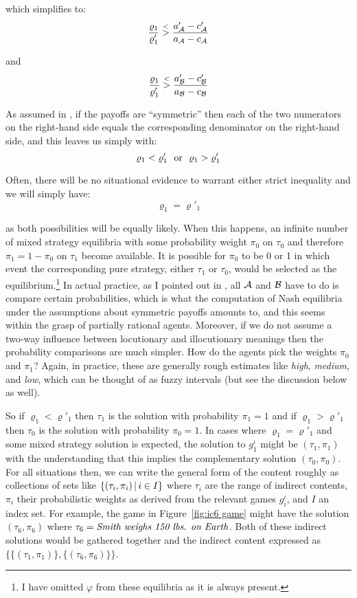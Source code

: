 \noindent which simplifies to: \[ \frac{\varrho_1}{\varrho'_1} \stackrel{<}{>} \frac{a'_{\cal A} - c'_{\cal A}}{a_{\cal A} - c_{\cal A}} \]

\noindent and \[ \frac{\varrho_1}{\varrho'_1} \stackrel{<}{>} \frac{a'_{\cal B} - c'_{\cal B}}{a_{\cal B} - c_{\cal B}} \]

\noindent As assumed in , if the payoffs are ``symmetric'' then each of the two numerators on the right-hand side equals the corresponding denominator on the right-hand side, and this leaves us simply with: \[ \varrho_1 < \varrho'_1\ \  \hbox{or}\ \ \varrho_1 > \varrho'_1 \]

\noindent Often, there will be no situational evidence to warrant either strict inequality and we will simply have: \[ \varrho_1 = \varrho'_1 \]

\noindent as both possibilities will be equally likely. When this happens, an infinite number of mixed strategy equilibria with some probability weight $\pi_0$ on $\tau_0$ and therefore $\pi_1 = 1 - \pi_0$ on $\tau_1$ become available. It is possible for $\pi_0$ to be 0 or 1 in which event the corresponding pure strategy, either $\tau_1$ or $\tau_0$, would be selected as the equilibrium.\footnote{I have omitted $\varphi$ from these equilibria as it is always present.} In actual practice, as I pointed out in , all $\cal A$ and $\cal B$ have to do is compare certain probabilities, which is what the computation of Nash equilibria under the assumptions about symmetric payoffs amounts to, and this seems within the grasp of partially rational agents. Moreover, if we do not assume a two-way influence between locutionary and illocutionary meanings then the probability comparisons are much simpler. How do the agents pick the weights $\pi_0$ and $\pi_1$? Again, in practice, these are generally rough estimates like \emph{high}, \emph{medium}, and \emph{low}, which can be thought of as fuzzy intervals (but see the discussion below as well). 


So if $\varrho_1 < \varrho'_1$ then $\tau_1$ is the solution with probability $\pi_1 = 1$ and if $\varrho_1 > \varrho'_1$ then $\tau_0$ is the solution with probability $\pi_0 = 1$. In cases where $\varrho_1 = \varrho'_1$ and some mixed strategy solution is expected, the solution to $g^\iota_1$ might be $(\tau_1, \pi_1)$ with the understanding that this implies the complementary solution $(\tau_0, \pi_0)$. For all situations then, we can write the general form of the content roughly as collections of sets like $\{(\tau_i, \pi_i) \,|\, i \in I\}$ where $\tau_i$ are the range of indirect contents, $\pi_i$ their probabilistic weights as derived from the relevant games $g^\iota_i$, and $I$ an index set. For example, the game in Figure~\ref{fig:ic6 game} might have the solution $(\tau_6, \pi_6)$ where $\tau_6 = \emph{Smith weighs 150 lbs. on Earth}$. Both of these indirect solutions would be gathered together and the indirect content expressed as $\{\{(\tau_1, \pi_1)\}, \{(\tau_6, \pi_6)\}\}$. 

